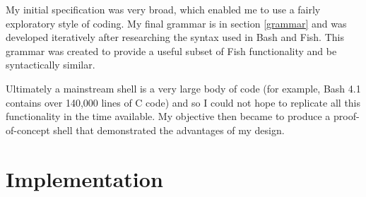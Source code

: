 \documentclass[12pt,twoside,notitlepage]{report}
\begin{document}
My initial specification was very broad, which enabled me to use a
fairly exploratory style of coding. My final grammar is in section
\ref{grammar} and was developed iteratively after researching the
syntax used in Bash and Fish. This grammar was created to provide a
useful subset of Fish functionality and be syntactically similar.

Ultimately a mainstream shell is a very large body of code (for
example, Bash 4.1 contains over 140,000 lines of C
code\footnotemark[1]) and so I could not hope to replicate all this
functionality in the time available. My objective then became to
produce a proof-of-concept shell that demonstrated the advantages of
my design.







\cleardoublepage

\chapter{Implementation}
\end{document}
